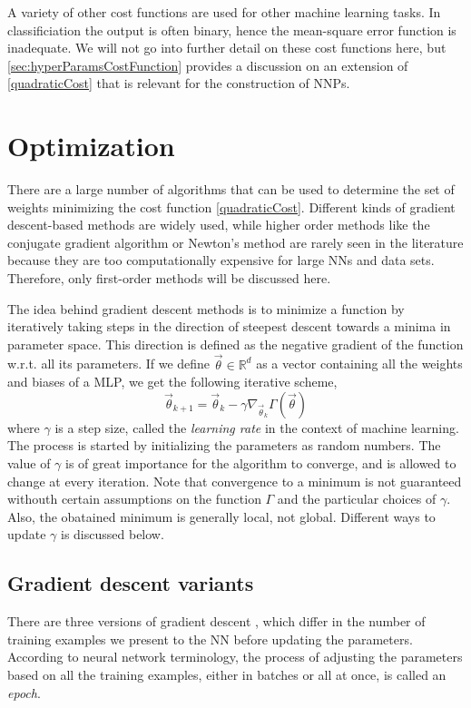 \documentclass[twoside,english]{uiofysmaster}
\begin{document}
A variety of other cost functions are used for other machine learning tasks. In classificiation the output is often binary, 
hence the mean-square error function is inadequate. We will not go into further detail on these cost functions here, but 
\autoref{sec:hyperParamsCostFunction} provides a discussion on an extension of \eqref{quadraticCost} that is relevant for 
the construction of NNPs. 


\section{Optimization} \label{sec:optimization}
There are a large number of algorithms that can be used to determine the set of weights minimizing the 
cost function \eqref{quadraticCost}. 
Different kinds of gradient descent-based methods are widely used, while higher order methods like
the conjugate gradient algorithm or Newton's method are rarely seen in the literature because they are 
too computationally expensive for large NNs and data sets. Therefore, only first-order methods will be discussed here. 

The idea behind gradient descent methods is to minimize a function by 
iteratively taking steps in the direction of steepest descent towards a minima in parameter space. 
This direction is defined as the negative gradient of the function w.r.t. 
all its parameters. If we define $\vec{\theta} \in \mathbb{R}^d$ as a vector containing all the weights and biases
of a MLP, we get the following iterative scheme,
\begin{equation}
 \vec{\theta}_{k+1} = \vec{\theta}_{k} - \gamma \nabla_{\vec{\theta}_k} \Gamma(\vec{\theta})
 \label{gradientDescent}
\end{equation}
where $\gamma$ is a step size, called the \textit{learning rate} in the context of machine learning. The process is started
by initializing the parameters as random numbers. The value of $\gamma$ is of great importance for the algorithm to converge,
and is allowed to change at every iteration. Note that convergence to 
a minimum is not guaranteed withouth certain assumptions on the function $\Gamma$ and the particular choices of $\gamma$.
Also, the obatained minimum is generally local, not global. 
Different ways to update $\gamma$ is discussed below.


\subsection{Gradient descent variants} \label{gradientDescentVariants}
There are three versions of gradient descent \cite{Ruder16}, which differ in 
the number of training examples we present to the NN before updating the parameters. 
According to neural network terminology, the process of adjusting the parameters based on all the training examples,
either in batches or all at once, is called an \textit{epoch}. 
\end{document}
